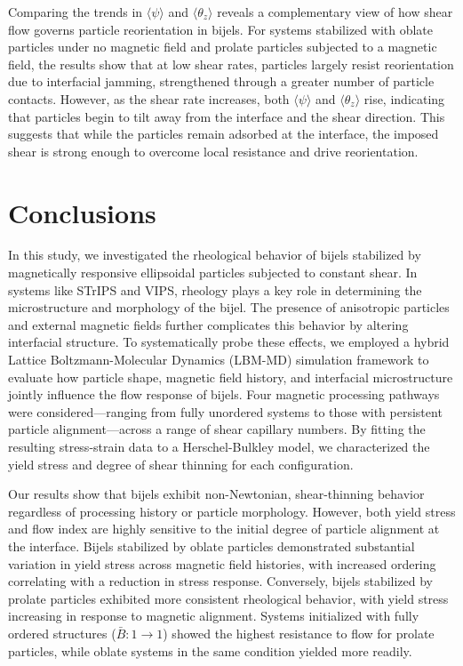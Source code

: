 Comparing the trends in $\langle \psi \rangle$ and $\langle \theta_z \rangle$ reveals a complementary view of how shear flow governs particle reorientation in bijels. For systems 
stabilized with oblate particles under no magnetic field and prolate particles subjected to a magnetic field, the results show that at low shear rates, particles largely resist 
reorientation due to interfacial jamming, strengthened through a greater number of particle contacts. However, as the shear rate increases, both $\langle \psi \rangle$ and 
$\langle \theta_z \rangle$ rise, indicating that particles begin to tilt away from the interface and the shear direction. This suggests that while the particles remain adsorbed 
at the interface, the imposed shear is strong enough to overcome local resistance and drive reorientation.

\section{Conclusions}

In this study, we investigated the rheological behavior of bijels stabilized by magnetically responsive ellipsoidal particles subjected to constant shear. 
In systems like STrIPS and VIPS, rheology plays a key role in determining the
microstructure and morphology of the bijel. The presence of anisotropic particles and external magnetic fields further complicates this behavior 
by altering interfacial structure. To systematically probe these effects, we employed a hybrid Lattice Boltzmann-Molecular Dynamics (LBM-MD) simulation 
framework to evaluate how particle shape, magnetic field history, and interfacial microstructure jointly influence the flow response of bijels. 
Four magnetic processing pathways were considered—ranging from fully unordered systems to those with persistent particle alignment—across a range of 
shear capillary numbers. By fitting the resulting stress-strain data to a Herschel-Bulkley model, we characterized the yield stress and degree of shear 
thinning for each configuration.

Our results show that bijels exhibit non-Newtonian, shear-thinning behavior regardless of processing history or particle morphology. However, both yield stress 
and flow index are highly sensitive to the initial degree of particle alignment at the interface. Bijels stabilized by oblate particles demonstrated substantial 
variation in yield stress across magnetic field histories, with increased ordering correlating with a reduction in stress response. Conversely, bijels stabilized 
by prolate particles exhibited more consistent rheological behavior, with yield stress increasing in response to magnetic alignment. Systems initialized with 
fully ordered structures ($\bar{B}:1 \rightarrow 1$) showed the highest resistance to flow for prolate particles, while oblate systems in the same condition 
yielded more readily.

